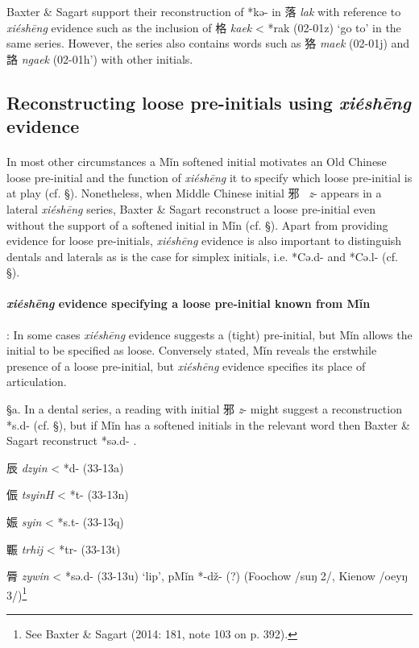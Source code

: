 Baxter \& Sagart support their reconstruction of *kə- in 落 \emph{lak
}with reference to  \emph{xiéshēng} evidence such as the inclusion of 格
 \emph{kaek} \textless{} *{}rak (02-01z) `go to' in the same series.
However, the series also contains words such as 狢 \emph{maek} (02-01j)
and 詻 \emph{ngaek} (02-01h') with other initials.

\subsection{\texorpdfstring{Reconstructing loose pre-initials using
 \emph{xiéshēng}
evidence}{Reconstructing loose pre-initials using xiéshēng evidence}}\label{reconstructing-loose-pre-initials-using-xiuxe9shux113ng-evidence}

\paragraph{}In most other circumstances a Mǐn softened initial motivates an Old
Chinese loose pre-initial and the function of  \emph{xiéshēng} it to
specify which loose pre-initial is at play (cf. §). Nonetheless, when
Middle Chinese initial 邪~ \emph{z}- appears in a lateral  \emph{xiéshēng}
series, Baxter \& Sagart reconstruct a loose pre-initial even without
the support of a softened initial in Mǐn (cf. §). Apart from providing
evidence for loose pre-initials,  \emph{xiéshēng} evidence is also
important to distinguish dentals and laterals as is the case for simplex
initials, i.e. *Cə.d{}- and *Cə.l{}- (cf. §).

\paragraph{\emph{xiéshēng}
evidence specifying a loose pre-initial known from Mǐn}: In some cases
 \emph{xiéshēng} evidence suggests a (tight) pre-initial, but Mǐn allows
the initial to be specified as loose. Conversely stated, Mǐn reveals the
erstwhile presence of a loose pre-initial, but  \emph{xiéshēng} evidence
specifies its place of articulation.

§a. In a dental series, a reading with initial 邪  \emph{z}- might
suggest a reconstruction *s.d- (cf. §), but if Mǐn has a softened
initials in the relevant word then Baxter \& Sagart reconstruct *sə.d-
\citeyearpar[181]{Baxter2014OldChinese}.

\begin{description} \item
辰  \emph{dzyin} \textless{} *d- (33-13a)

\item
侲  \emph{tsyinH} \textless{} *t- (33-13n)

\item
娠  \emph{syin} \textless{} *s.t- (33-13q)

\item
辴  \emph{trhij} \textless{} *t{}r- (33-13t)

\item
脣  \emph{zywin} \textless{} *sə.d- (33-13u) `lip', pMǐn *-dž- (?)
(Foochow /suŋ 2/, Kienow /oeyŋ 3/)\footnote{See Baxter \& Sagart (2014:
  181, note 103 on p. 392).}
\end{description}


